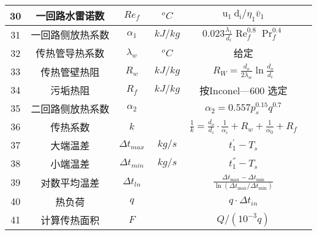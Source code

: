 \begin{table}[H]
{\begin{tabular}{|c|c|c|c|c|c|}
            30   & 一回路水雷诺数   & $ Re_f $            & $ ^oC $   & $ \mathrm{u}_{1} \mathrm{~d}_{\mathrm{i}} / \eta_{1} \bar{v}_{1} $                                 &       \\ \hline
            31   & 一回路侧放热系数 & $ \alpha_1 $        & $ kJ/kg $ & $ 0.023 \frac{\lambda_{1}}{d_{i}} \operatorname{Re}_{f}^{0.8} \operatorname{Pr}_{f}^{0.4} $        &       \\ \hline
            32   & 传热管导热系数   & $ \lambda_w $       & $ ^oC $   & 给定                                                                                               &       \\ \hline
            33   & 传热管壁热阻     & $ R_w $             & $ kJ/kg $ & $ R_{W}=\frac{d_{o}}{2 \lambda_{w}} \ln \frac{d_{o}}{d_{i}} $                                      &       \\ \hline
            34   & 污垢热阻         & $ R_f $             & $ kJ/kg $ & 按Inconel—600 选定                                                                                 &       \\ \hline
            35   & 二回路侧放热系数 & $ \alpha_2 $        &           & $ \alpha_{2}=0.557 p_{s}^{0.15} q^{0.7} $                                                          &       \\ \hline
            36   & 传热系数         & $ k $               &           & $ \frac{1}{k}=\frac{d_{o}}{d_{i}} \cdot \frac{1}{\alpha_{i}}+R_{w}+\frac{1}{\alpha_{0}}+R_{f} $    &       \\ \hline
            37   & 大端温差         & $ \Delta t_{max} $  & $ kg/s $  & $ t_{1}^{'} - T_s $                                                                                &       \\ \hline
            38   & 小端温差         & $ \Delta t_{min} $  & $ kg/s $  & $ t_{1}^{''} - T_s $                                                                               &       \\ \hline
            39   & 对数平均温差     & $ \Delta t_{ln} $   &           & $ \frac{\Delta t_{\max }-\Delta t_{\min }}{\ln \left(\Delta t_{\max } / \Delta t_{\min }\right)} $ &       \\ \hline
            40   & 热负荷           & $ q $               &           & $ q \cdot \Delta t_{in}$                                                                           &       \\ \hline
            41   & 计算传热面积     & $ F $               &           & $ Q/(10^{-3}q) $                                                                                   &       \\ \hline

\end{tabular}}
\end{table}
